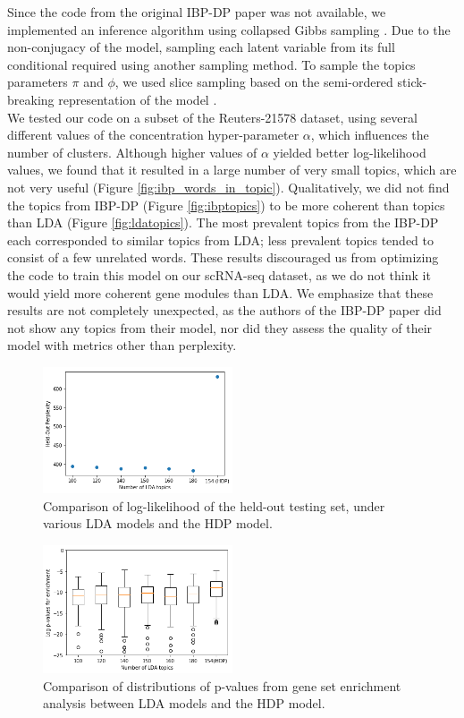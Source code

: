 \documentclass{article}
\begin{document}
Since the code from the original IBP-DP paper was not available, we implemented an inference algorithm using collapsed Gibbs sampling \cite{IBP}. Due to the non-conjugacy of the model, sampling each latent variable from its full conditional required using another sampling method. To sample the topics parameters $\pi$ and $\phi$, we used slice sampling based on the semi-ordered stick-breaking representation of the model \cite{IBP2}.\\

We tested our code on a subset of the Reuters-21578 dataset, using several different values of the concentration hyper-parameter $\alpha$, which influences the number of clusters. Although higher values of $\alpha$ yielded better log-likelihood values, we found that it resulted in a large number of very small topics, which are not very useful (Figure \ref{fig:ibp_words_in_topic}). Qualitatively, we did not find the topics from IBP-DP (Figure \ref{fig:ibptopics}) to be more coherent than topics than LDA (Figure \ref{fig:ldatopics}). The most prevalent topics from the IBP-DP each corresponded to similar topics from LDA; less prevalent topics tended to consist of a few unrelated words. These results discouraged us from optimizing the code to train this model on our scRNA-seq dataset, as we do not think it would yield more coherent gene modules than LDA. We emphasize that these results are not completely unexpected, as the authors of the IBP-DP paper did not show any topics from their model, nor did they assess the quality of their model with metrics other than perplexity.

\begin{figure}
    \centering
    \includegraphics[width=0.5\textwidth]{figs/hdp-perplexity}
    \caption{Comparison of log-likelihood of the held-out testing set, under various LDA models and the HDP model.}
    \label{fig:hdp-perplexity}
\end{figure}

\begin{figure}
    \centering
    \includegraphics[width=0.5\textwidth]{figs/hdp-enrichment}
    \caption{Comparison of distributions of p-values from gene set enrichment analysis between LDA models and the HDP model.}
    \label{fig:hdp-enrichment}
\end{figure}
\end{document}
